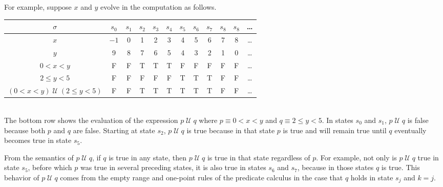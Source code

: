 \documentclass[12pt, fleqn, leqno]{article}
\newcommand{\lllgap}{12pt}                          %
\newcommand{\Until}{\;\mathcal{U}\;}
\begin{document}
For example, suppose $x$ and $y$ evolve in the computation as follows.\\[\lllgap]
\begin{tabular}{c|ccccccccccc}
  $\sigma$                  & $s_0$ & $s_1$ & $s_2$ & $s_3$ & $s_4$ & $s_5$ & $s_6$ & $s_7$ & $s_8$ & $s_8$ & \dots \\
  \hline
  $x$                       & $-1$  & 0     & 1     & 2     & 3     & 4     & 5     &  6    &  7    &  8    &  \dots\\
  $y$                       & 9     & 8     & 7     & 6     & 5     & 4     & 3     &  2    &  1    &  0    &  \dots\\
  $0<x<y$                   & F     & F     & T     & T     & T     & F     & F     &  F    &  F    &  F    &  \dots\\
  $2\le y<5$                & F     & F     & F     & F     & F     & T     & T     &  T    &  F    &  F    &  \dots\\
  $(0<x<y)\Until(2\le y<5)$ & F     & F     & T     & T     & T     & T     & T     &  T    &  F    &  F    &  \dots
\end{tabular}\\[\lllgap]
The bottom row shows the evaluation of the expression $p\Until q$ where $p\equiv 0<x<y$ and $q\equiv 2\le y<5$.
In states $s_0$ and $s_1$, $p\Until q$ is false because both $p$ and $q$ are false.
Starting at state $s_2$, $p\Until q$ is true because in that state $p$ is true and will remain true until $q$
eventually becomes true in state $s_5$.

From the semantics of $p\Until q$, if $q$ is true in any state, then $p\Until q$ is true in that state regardless of $p$.
For example, not only is $p\Until q$ true in state $s_5$, before which $p$ was true in several preceding states,
it is also true in states $s_6$ and $s_7$, because in those states $q$ is true.
This behavior of $p\Until q$ comes from the empty range and one-point rules \cite{LADM} of the predicate calculus in the case that
$q$ holds in state $s_j$ and $k=j$.
\end{document}
